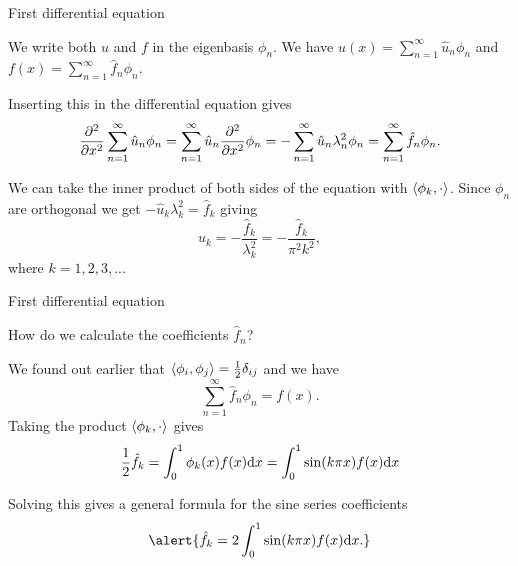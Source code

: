 
\begin{frame}{First differential equation}
	
	We write both $ u $ and $ f $ in the \alert{eigenbasis} $ \phi_n $. 
	We have $ u(x) = \sum_{n=1}^\infty \hat{u}_n \phi_n $ and $ f(x) = \sum_{n=1}^\infty \hat{f}_n \phi_n $. 
	
	\pause
	Inserting this in the differential equation gives 
	\[ \pfrac[2]{}{x} \sum_{n=1}^\infty \hat{u}_n \phi_n 
	= \sum_{n=1}^\infty \hat{u}_n \pfrac[2]{}{x} \phi_n
	= -\sum_{n=1}^\infty \hat{u}_n \lambda_n^2 \phi_n
	= \sum_{n=1}^\infty \hat{f}_n \phi_n.
	\]
	
	\pause
	We can take the inner product of both sides of the equation with $ \iprod{\phi_k}{\cdot} $. Since $ \phi_n $ are orthogonal we get $ - \hat{u}_{k} \lambda_k^2 = \hat{f}_k $ giving
	\[ \hat{u}_k = -\frac{\hat{f}_k}{\lambda_k^2} = -\frac{\hat{f}_k}{\pi^2 k^2}, \]
	where $ k=1,2,3,... $
	
	
\end{frame}


\begin{frame}{First differential equation}
	
	How do we calculate the coefficients  $ \hat{f}_n $?
	
	\pause
	We found out earlier that $ \iprod{\phi_i}{\phi_j} = \frac{1}{2} \delta_{ij} $ and we have 
	\[ \sum_{n=1}^\infty \hat{f}_n \phi_n = f(x). \]
	Taking the product $ \iprod{\phi_k}{\cdot} $ gives 
	\[ \frac{1}{2} \hat{f}_k = \int_{0}^{1} \phi_k(x) f(x) \diff x = \int_{0}^{1} \sin(k\pi x) f(x) \diff x  \]
	
	\pause
	Solving this gives a general formula for the sine series coefficients
	\begin{equation}\label{eq:sine_series_coeff}
		\alert{\hat{f}_k = 2 \int_{0}^{1} \sin(k\pi x) f(x) \diff x.}
	\end{equation}
\end{frame}


